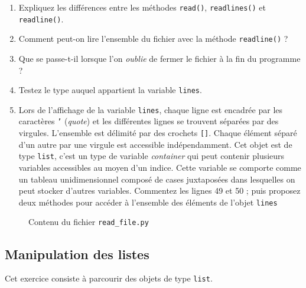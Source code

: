 \begin{enumerate}

\item Expliquez  les différences  entre les  méthodes \texttt{read()},
  \texttt{readlines()} et \texttt{readline()}.

\item  Comment peut-on lire  l'ensemble  du fichier  avec la  méthode
  \texttt{readline()} ?

\item  Que se  passe-t-il lorsque  l'on \textit{oublie}  de fermer  le
  fichier à la fin du programme ?

\item Testez le type auquel appartient la variable \texttt{lines}.

\item Lors de l'affichage de  la variable \texttt{lines}, chaque ligne
  est encadrée par les caractères \texttt{'} (\emph{quote}) et les différentes
  lignes se trouvent
  séparées par des  virgules. L'ensemble est délimité  par des crochets
  \texttt{[]}.  Chaque  élément séparé d'un autre par une  virgule est accessible
  indépendamment.  Cet objet est de  type \texttt{list}, c'est un type
  de  variable \emph{container}  qui  peut  contenir   plusieurs  variables accessibles
  au moyen d'un indice. Cette variable se comporte comme un tableau unidimensionnel
  composé de cases juxtaposées dans lesquelles on peut stocker d'autres variables.
  Commentez  les lignes  49 et  50 ; puis proposez  deux méthodes  pour
  accéder à l'ensemble des éléments de l'objet \texttt{lines}

\end{enumerate}


\begin{figure}  
  
  \caption{Contenu du fichier \texttt{read\_file.py}}
  \label{stat_read_file}
\end{figure}



\subsection{Manipulation des listes}
Cet exercice consiste à parcourir des objets de type \texttt{list}.

